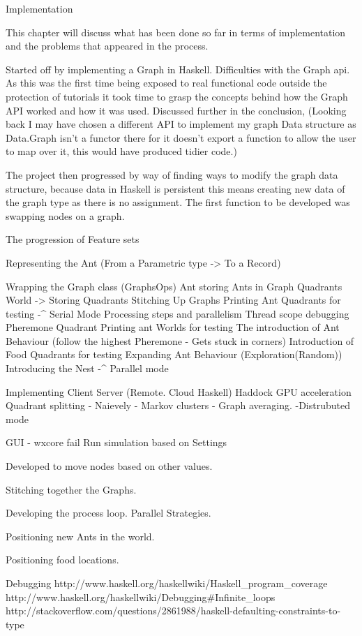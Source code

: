 \documentclass[main.tex]{subfiles}
\begin{document}
Implementation

This chapter will discuss what has been done so far in terms of implementation and the problems that appeared in the process.

Started off by implementing a Graph in Haskell. Difficulties with the Graph api. As this was the first time being exposed to real functional code outside the protection of tutorials it took time to grasp the concepts behind how the Graph API worked and how it was used. Discussed further in the conclusion, (Looking back I may have chosen a different API to implement my graph Data structure as Data.Graph isn't a functor there for it doesn't export a function to allow the user to map over it, this would have produced tidier code.)

The project then progressed by way of finding ways to modify the graph data structure, because data in Haskell is persistent this means creating new data of the graph type as there is no assignment. The first function to be developed was swapping nodes on a graph.


The progression of Feature sets

Representing the Ant (From a Parametric type -> To a Record)

Wrapping the Graph class (GraphsOps)
Ant storing Ants in Graph Quadrants
World -> Storing Quadrants
Stitching Up Graphs
Printing Ant Quadrants for testing -^ Serial Mode
Processing steps and parallelism
Thread scope debugging
Pheremone Quadrant
Printing ant Worlds for testing
The introduction of Ant Behaviour (follow the highest Pheremone - Gets stuck in corners)
Introduction of Food Quadrants for testing
Expanding Ant Behaviour (Exploration(Random))
Introducing the Nest -^ Parallel mode

Implementing Client Server (Remote. Cloud Haskell) 
Haddock
GPU acceleration
Quadrant splitting - Naievely - Markov clusters - Graph averaging.
-Distrubuted mode

GUI - wxcore fail
Run simulation based on Settings

Developed to move nodes based on other values.

Stitching together the Graphs.

Developing the process loop. Parallel Strategies.

Positioning new Ants in the world.

Positioning food locations.

Debugging
http://www.haskell.org/haskellwiki/Haskell_program_coverage
http://www.haskell.org/haskellwiki/Debugging#Infinite_loops
http://stackoverflow.com/questions/2861988/haskell-defaulting-constraints-to-type

\end{document}
